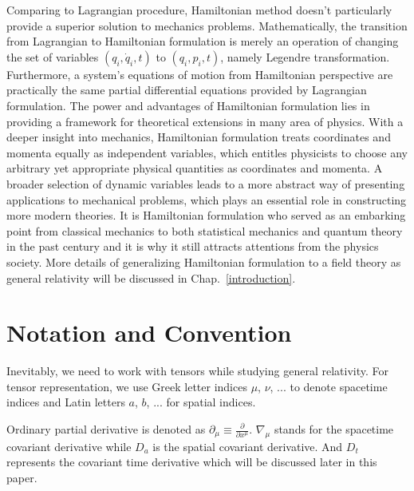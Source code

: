 Comparing to Lagrangian procedure, Hamiltonian method doesn't particularly provide a superior solution to mechanics problems. Mathematically, the transition from Lagrangian to Hamiltonian formulation is merely an operation of changing the set of variables $(q_{i}, {\dot q}_{i}, t)$ to $(q_{i}, p_{i}, t)$, namely Legendre transformation. Furthermore, a system's equations of motion from Hamiltonian perspective are practically the same partial differential equations provided by Lagrangian formulation. The power and advantages of Hamiltonian formulation lies in providing a framework for theoretical extensions in many area of physics. With a deeper insight into mechanics, Hamiltonian formulation treats coordinates and momenta equally as independent variables, which entitles physicists to choose any arbitrary yet appropriate physical quantities as coordinates and momenta. A broader selection of dynamic variables leads to a more abstract way of presenting applications to mechanical problems, which plays an essential role in constructing more modern theories. It is Hamiltonian formulation who served as an embarking point from classical mechanics to both statistical mechanics and quantum theory in the past century and it is why it still attracts attentions from the physics society\cite{goldstein}. More details of generalizing Hamiltonian formulation to a field theory as general relativity will be discussed in Chap.~\ref{introduction}. 

\section{Notation and Convention}\label{notation} Inevitably, we need to work with tensors while studying general relativity. For tensor representation, we use Greek letter indices $\mu$, $\nu$, ... to denote spacetime indices and Latin letters $a$, $b$, ... for spatial indices. 

Ordinary partial derivative is denoted as $
\partial_{\mu} \equiv \frac{
\partial}{
\partial x^{\mu}}$. $\nabla_{\mu}$ stands for the spacetime covariant derivative while $D_{a}$ is the spatial covariant derivative. And $D_{t}$ represents the covariant time derivative which will be discussed later in this paper.

